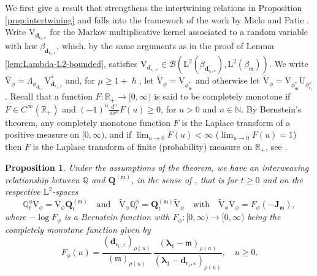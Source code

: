 \documentclass[10pt]{amsart}
\let\epsilon\varepsilon
\theoremstyle{plain}
\newtheorem{proposition}[theorem]{Proposition}
\theoremstyle{definition}
\newcommand{\N}{\mathbb{N}}
\newcommand{\R}{\mathbb{R}}
\newcommand{\J}{\mathds{Q}}
\newcommand{\Leb}{\mathrm{L}}
\newcommand{\calJd}{\mathbf{J}}
\newcommand{\m}{\mathfrak{m}}
\newcommand{\dpt}{\bm{d}_{\vat,\epsilon}}
\newcommand{\dz}{{\bm{d}}_{1,\epsilon}}
\newcommand{\Bop}[2]{\mathcal{B}(#1,#2)}
\newcommand{\lam}{{\bm{\lambda}_1}}
\newcommand{\vat}{{\mathsf{r}_1}}
\newcommand{\phm}{{\phi_\m^*}}
\renewcommand{\varphi}{{\phi_{\vat}^{\checkmark}}}
\newcommand{\Q}[1][\mo]{\mathbf{Q}^{({#1})}}
\newcommand{\gab}[1][\lam,\mo]{{\beta_{#1}}}
\let\h\hslash
\let\mo\mu
\begin{document}
We first give a result that strengthens the intertwining relations in Proposition \ref{prop:intertwining} and falls into the framework of the work by Miclo and Patie \cite{Patie-Miclo}. Write $\mathrm{V}_{\dpt}$ for the Markov multiplicative kernel associated to a random variable with law $\gab[\dpt]$, which, by the same arguments as in the proof of Lemma \ref{lem:Lambda-L2-bounded}, satisfies $\mathrm{V}_{\dpt} \in \Bop{\Leb^2(\gab[\dpt])}{\Leb^2(\gab[\m])}$. We write $\overline{\mathrm{V}}_\phi = \Lambda_{\phi_{\dz}} \mathrm{V}_{\dpt}^*$ and, for $\mo \geq 1+\h$, let $\widetilde{\mathrm{V}}_\phi = \mathrm{V}_{\phm}$ and otherwise let $\widetilde{\mathrm{V}}_\phi = \mathrm{V}_{\phm} \mathrm{U}_\varphi$. Recall that a function $F:\R_+ \to [0,\infty)$ is said to be completely monotone if $F \in C^\infty(\R_+)$ and $(-1)^n \frac{d^n}{dx^n} F(u) \geq 0$, for $u > 0$ and $n \in \N$. By Bernstein's theorem, any completely monotone function $F$ is the Laplace transform of a positive measure on $[0,\infty)$, and if $\lim_{u \to 0} F(u) < \infty$ (\resp $\lim_{u \to 0} F(u) =1$) then $F$ is the Laplace transform of finite (\resp probability) measure on $\R_+$, see \eg \cite[Chap.\,1]{SchillingSongVondracek10}.

\begin{proposition}
\label{prop:cmir}
Under the assumptions of the theorem, we have an interweaving relationship between $\J$ and $\Q[\m]$, in the sense of \cite{Patie-Miclo}, that is for $t \geq 0$ and on the respective $\Leb^2$-spaces
\begin{equation}
\label{eq:cmir}
\J_t^\phi \overline{\mathrm{V}}_\phi = \overline{\mathrm{V}}_\phi \Q[\m]_t \quad \text{and} \quad \widetilde{\mathrm{V}}_\phi \J_t^\phi = \Q[\m]_t \widetilde{\mathrm{V}}_\phi \quad \text{with} \quad \widetilde{\mathrm{V}}_\phi \overline{\mathrm{V}}_\phi = F_\phi(-\calJd_\m),
\end{equation}
where $-\log F_\phi$ is a Bernstein function with $F_\phi:[0,\infty) \to [0,\infty)$ being the completely monotone function given by
\begin{equation*}
F_\phi(u) = \frac{(\dpt)_{\rho(u)}}{(\m)_{\rho(u)}}\, \frac{(\lam-\m)_{\rho(u)}}{(\lam-\dpt)_{\rho(u)}} , \quad u \geq 0.
\end{equation*}
\end{proposition}
\end{document}
